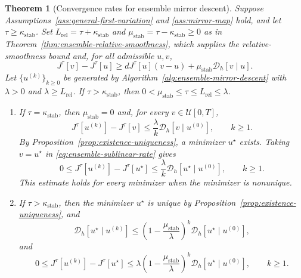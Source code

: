 \documentclass[11pt]{amsart}
\numberwithin{equation}{section} %
\newtheorem{theorem}{Theorem}[section]
\theoremstyle{remark}
\begin{document}
\begin{theorem}[Convergence rates for ensemble mirror descent]
\label{thm:ensemble-mirror-rates}
Suppose Assumptions~\ref{ass:general-first-variation} and
\ref{ass:mirror-map} hold, and let
$\tau\ge\kappa_{\mathrm{stab}}$. Set
$L_{\mathrm{rel}}=\tau+\kappa_{\mathrm{stab}}$ and
$\mu_{\mathrm{stab}}=\tau-\kappa_{\mathrm{stab}}\ge0$ as in
Theorem~\ref{thm:ensemble-relative-smoothness}, which supplies the
relative-smoothness bound and, for all admissible $u,v$,
\begin{equation}
\label{eq:rate-relative-convexity}
J^\tau[v]-J^\tau[u]\ge dJ^\tau[u](v-u)
+\mu_{\mathrm{stab}}\mathcal D_h[v\mid u].
\end{equation}
Let $\{u^{(k)}\}_{k\ge0}$ be generated
by Algorithm~\ref{alg:ensemble-mirror-descent} with $\lambda>0$ and
$\lambda\ge L_{\mathrm{rel}}$.
If $\tau>\kappa_{\mathrm{stab}}$, then
$0<\mu_{\mathrm{stab}}\le\tau\le L_{\mathrm{rel}}\le\lambda$.
\begin{enumerate}
\item If $\tau=\kappa_{\mathrm{stab}}$, then
$\mu_{\mathrm{stab}}=0$ and, for every $v\in\mathcal U[0,T]$,
\begin{equation}
\label{eq:ensemble-sublinear-rate}
J^\tau[u^{(k)}]-J^\tau[v]\le\frac\lambda k
\mathcal D_h[v\mid u^{(0)}],\qquad k\ge1.
\end{equation}
By Proposition~\ref{prop:existence-uniqueness}, a minimizer $u^\star$
exists. Taking $v=u^\star$ in \eqref{eq:ensemble-sublinear-rate} gives
\[
0\le J^\tau[u^{(k)}]-J^\tau[u^\star]
\le\frac\lambda k\mathcal D_h[u^\star\mid u^{(0)}],\qquad k\ge1.
\]
This estimate holds for every minimizer when the minimizer is nonunique.
\item If $\tau>\kappa_{\mathrm{stab}}$, then the minimizer $u^\star$ is
unique by Proposition~\ref{prop:existence-uniqueness}, and
\begin{equation}
\label{eq:bregman-geometric-rate}
\mathcal D_h[u^\star\mid u^{(k)}]\le
\left(1-\frac{\mu_{\mathrm{stab}}}{\lambda}\right)^k\mathcal D_h[u^\star\mid u^{(0)}],
\end{equation}
and
\begin{equation}
\label{eq:ensemble-geometric-rate}
0\le J^\tau[u^{(k)}]-J^\tau[u^\star]
\le\lambda\left(1-\frac{\mu_{\mathrm{stab}}}{\lambda}\right)^{k}
\mathcal D_h[u^\star\mid u^{(0)}],\qquad k\ge1.
\end{equation}
\end{enumerate}
\end{theorem}
\end{document}
